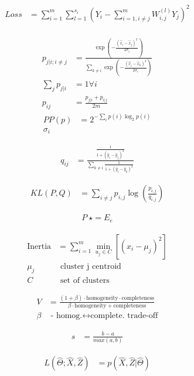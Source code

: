 \documentclass[USenglish,final,authoryear,12pt]{article}
\begin{document}
\begin{align*}
	Loss &= \sum_{i=1}^{m}\sum_{l=1}^{s_i}\left(Y_i - \sum_{i=1,i\neq j}^m W^{(l)}_{i,j}Y_j\right)^2\\
\end{align*}

\begin{align*}
	p_{j|i;i\neq j} &= \frac{\exp\left(-\frac{(\hat{x}_i-\hat{x}_j)^2}
		{2\sigma_i}\right)}{\sum_{k\neq i}\exp\left(-\frac{(\hat{x}_i-\hat{x}_k)^2}
		{2\sigma_i}\right)}\\
	\sum_{j}p_{j|i}&=1 \forall i\\
	p_{ij} &= \frac{p_{j|i}+p_{i|j}}{2m}
\end{align*}
\begin{align*}
	PP(p) &= 2^{-\sum_{i}p(i)\log_2p(i)}\\
	\sigma_i
\end{align*}

\begin{align*}
	q_{ij} &= \frac{\frac{1}{1+\left(\hat{y}_i - \hat{y}_j\right)^2}}{\sum_{k\neq i}\frac{1}{1+\left(\hat{y}_i - \hat{y}_k\right)^2}}
\end{align*}

\begin{align*}
	KL(P,Q) &= \sum_{i\neq j}p_{i,j}\log\left(\frac{p_{i,j}}{q_{i,j}}\right)
\end{align*}

\begin{align*}
	P ~\star= E_e
\end{align*}

\begin{align*}
	\text{Inertia} &= \sum_{i=1}^{m}\min_{u_j \in C} \left[\left(x_i - \mu_j\right)^2\right]\\
	\mu_j & \text{ cluster j centroid}\\
	C&\text{ set of clusters}
\end{align*}

\begin{align*}
	V &= \frac{\left(1+\beta\right)\cdot\text{homogeneity}\cdot\text{completeness}}{\beta \cdot \text{homogeneity}+\text{completeness}}\\
	\beta & \text{ - homog.}\leftrightarrow\text{complete. trade-off}
\end{align*}

\begin{align*}
	s &= \frac{b-a}{max(a,b)}
\end{align*}

\begin{align*}
	L(\hat{\Theta}; \hat{X}, \hat{Z}) &= p(\hat{X},\hat{Z} | \hat{\Theta})
\end{align*}
\end{document}
